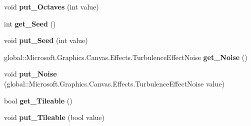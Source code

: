 \begin{DoxyCompactItemize}
\mbox{\label{class_microsoft_1_1_graphics_1_1_canvas_1_1_effects_1_1_turbulence_effect_aec513446282954b001d8e59dba3cffad}} 
void {\bfseries put\+\_\+\+Octaves} (int value)
\item 
\mbox{\label{class_microsoft_1_1_graphics_1_1_canvas_1_1_effects_1_1_turbulence_effect_a29a04e9d42fdf797395cdfd87bbdcfa2}} 
int {\bfseries get\+\_\+\+Seed} ()
\item 
\mbox{\label{class_microsoft_1_1_graphics_1_1_canvas_1_1_effects_1_1_turbulence_effect_a6e7659f9f3c007f28dcce1d14bbdd44a}} 
void {\bfseries put\+\_\+\+Seed} (int value)
\item 
\mbox{\label{class_microsoft_1_1_graphics_1_1_canvas_1_1_effects_1_1_turbulence_effect_ae13e3952dc96341cc6f8b4396a4d0f69}} 
global\+::\+Microsoft.\+Graphics.\+Canvas.\+Effects.\+Turbulence\+Effect\+Noise {\bfseries get\+\_\+\+Noise} ()
\item 
\mbox{\label{class_microsoft_1_1_graphics_1_1_canvas_1_1_effects_1_1_turbulence_effect_a0439ce3457931371a7e49de7dcd7a919}} 
void {\bfseries put\+\_\+\+Noise} (global\+::\+Microsoft.\+Graphics.\+Canvas.\+Effects.\+Turbulence\+Effect\+Noise value)
\item 
\mbox{\label{class_microsoft_1_1_graphics_1_1_canvas_1_1_effects_1_1_turbulence_effect_af2568a4c8c4b6ac6a1cd5dd2a3ed936c}} 
bool {\bfseries get\+\_\+\+Tileable} ()
\item 
\mbox{\label{class_microsoft_1_1_graphics_1_1_canvas_1_1_effects_1_1_turbulence_effect_a8588799f1b33e53343293169f398a24f}} 
void {\bfseries put\+\_\+\+Tileable} (bool value)
\item 
\mbox{\label{class_microsoft_1_1_graphics_1_1_canvas_1_1_effects_1_1_turbulence_effect_a2c596cbdbfb7b80b475624a4c9dce0e8}} 

\end{DoxyCompactItemize}
